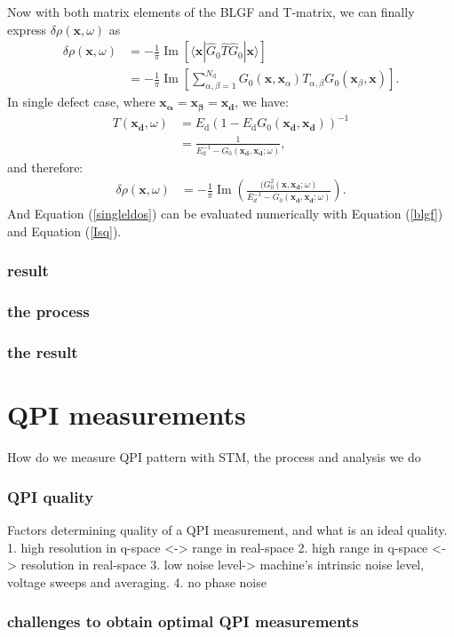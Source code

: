 Now with both matrix elements of the \ac{BLGF} and T-matrix, we can finally express $\delta\rho(\mathbf{x},\omega)$ as 
\begin{align}
	\delta\rho(\mathbf{x},\omega) &= - \frac{1}{\pi} \operatorname{Im} \left[ \langle \mathbf{x} | \hat{G}_0 \hat{T} \hat{G}_0 | \mathbf{x} \rangle \right] \\
	&= -\frac{1}{\pi} \operatorname{Im} \left[\sum_{\alpha, \beta=1}^{N_{\text{d}}} G_0(\mathbf{x}, \mathbf{x}_\alpha) T_{\alpha, \beta} G_0(\mathbf{x}_\beta, \mathbf{x})\right].
\end{align}
In single defect case, where $\mathbf{x_\alpha} = \mathbf{x_\beta} = \mathbf{x_d}$, we have: 
\begin{align}
	T(\mathbf{x_d},\omega) &= E_{\text{d}} \left( 1 - E_{\text{d}} G_0(\mathbf{x_d}, \mathbf{x_d}) \right)^{-1} \label{T_matrix_ele} \\
	&= \frac{1}{E_{\text{d}}^{-1} - G_0(\mathbf{x_d}, \mathbf{x_d}; \omega)},
\end{align}
and therefore: 
\begin{align}
	\delta\rho(\mathbf{x},\omega) &= - \frac{1}{\pi} \operatorname{Im}(\frac{(G_0^2(\mathbf{x},\mathbf{x_d};\omega)}{E_d^{-1} - G_0(\mathbf{x_d},\mathbf{x_d};\omega)}) \label{singleldos}. 
\end{align}
And Equation (\ref{singleldos}) can be evaluated numerically with Equation (\ref{blgf}) and Equation (\ref{Isq}).

\subsubsection{result}

  




\subsubsection{the process}
\subsubsection{the result}


\section{QPI measurements}
How do we measure QPI pattern with STM, the process and analysis we do 
\subsubsection{QPI quality}
Factors determining quality of a QPI measurement, and what is an ideal quality. 
1. high resolution in q-space <-> range in real-space
2. high range in q-space <-> resolution in real-space
3. low noise level-> machine's intrinsic noise level, voltage sweeps and averaging.
4. no phase noise 
\subsubsection{challenges to obtain optimal QPI measurements}
 
